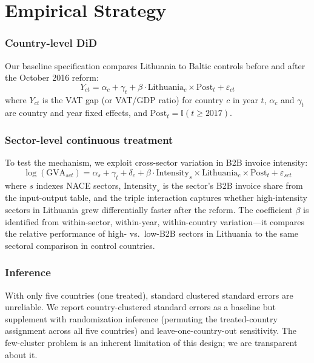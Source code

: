 \documentclass[12pt]{article}
\begin{document}
\section{Empirical Strategy}

\subsubsection*{Country-level DiD} Our baseline specification compares Lithuania to Baltic controls before and after the October 2016 reform:
\begin{equation}\label{eq:country}
Y_{ct} = \alpha_c + \gamma_t + \beta \cdot \text{Lithuania}_c \times \text{Post}_t + \varepsilon_{ct}
\end{equation}
where $Y_{ct}$ is the VAT gap (or VAT/GDP ratio) for country $c$ in year $t$, $\alpha_c$ and $\gamma_t$ are country and year fixed effects, and $\text{Post}_t = \mathbb{I}(t \geq 2017)$.

\subsubsection*{Sector-level continuous treatment} To test the mechanism, we exploit cross-sector variation in B2B invoice intensity:
\begin{equation}\label{eq:sector}
\log(\text{GVA}_{sct}) = \alpha_s + \gamma_t + \delta_c + \beta \cdot \text{Intensity}_s \times \text{Lithuania}_c \times \text{Post}_t + \varepsilon_{sct}
\end{equation}
where $s$ indexes NACE sectors, $\text{Intensity}_s$ is the sector's B2B invoice share from the input-output table, and the triple interaction captures whether high-intensity sectors in Lithuania grew differentially faster after the reform. The coefficient $\beta$ is identified from within-sector, within-year, within-country variation---it compares the relative performance of high- vs.\ low-B2B sectors in Lithuania to the same sectoral comparison in control countries.

\subsubsection*{Inference} With only five countries (one treated), standard clustered standard errors are unreliable. We report country-clustered standard errors as a baseline but supplement with randomization inference (permuting the treated-country assignment across all five countries) and leave-one-country-out sensitivity. The few-cluster problem is an inherent limitation of this design; we are transparent about it.
\end{document}
